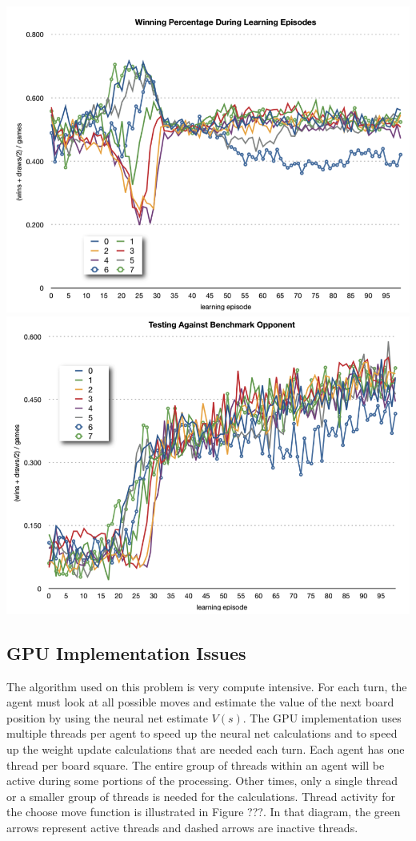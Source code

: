 \center
\includegraphics[scale=0.8]{fig12}
\includegraphics[scale=0.8]{fig13}
\begin{flushleft}


\subsection{GPU Implementation Issues}
The algorithm used on this problem is very compute intensive.  For each turn, the agent must look at all possible moves and estimate the value of the next board position by using the neural net estimate $V(s)$.  The GPU implementation uses multiple threads per agent to speed up the neural net calculations and to speed up the weight update calculations that are needed each turn.  Each agent has one thread per board square.  The entire group of threads within an agent will be active during some portions of the processing.  Other times, only a single thread or a smaller group of threads is needed for the calculations.  Thread activity for the choose move function is illustrated in Figure ???.  In that diagram, the green arrows represent active threads and dashed arrows are inactive threads.

\end{flushleft}

